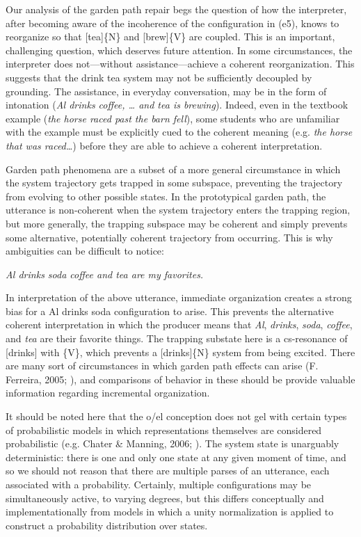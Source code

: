   Our analysis of the garden path repair begs the question of how the interpreter, after becoming aware of the incoherence of the configuration in (e5), knows to reorganize so that [tea]\{N\} and [brew]\{V\} are coupled. This is an important, challenging question, which deserves future attention. In some circumstances, the interpreter does not—without assistance—achieve a coherent reorganization. This suggests that the {\textbar}drink tea{\textbar} system may not be sufficiently decoupled by grounding. The assistance, in everyday conversation, may be in the form of intonation (\textit{Al drinks coffee, … and tea is brewing}). Indeed, even in the textbook example (\textit{the horse raced past the barn fell}), some students who are unfamiliar with the example must be explicitly cued to the coherent meaning (e.g. \textit{the horse that was raced…}) before they are able to achieve a coherent interpretation. 

  Garden path phenomena are a subset of a more general circumstance in which the system trajectory gets trapped in some subspace, preventing the trajectory from evolving to other possible states. In the prototypical garden path, the utterance is non-coherent when the system trajectory enters the trapping region, but more generally, the trapping subspace may be coherent and simply prevents some alternative, potentially coherent trajectory from occurring. This is why ambiguities can be difficult to notice:

    \textit{Al drinks soda coffee and tea are my favorites.}

  In interpretation of the above utterance, immediate organization creates a strong bias for a {\textbar}Al drinks soda{\textbar} configuration to arise. This prevents the alternative coherent interpretation in which the producer means that \textit{Al}, \textit{drinks}, \textit{soda}, \textit{coffee}, and \textit{tea} are their favorite things. The trapping substate here is a cs-resonance of [drinks] with \{V\}, which prevents a [drinks]\{N\} system from being excited. There are many sort of circumstances in which garden path effects can arise (F. Ferreira, 2005; \citealt{Pritchett1988}), and comparisons of behavior in these should be provide valuable information regarding incremental organization. 

  It should be noted here that the o/el conception does not gel with certain types of probabilistic models in which representations themselves are considered probabilistic (e.g. Chater \& Manning, 2006; \citealt{Manning2003}). The system state is unarguably deterministic: there is one and only one state at any given moment of time, and so we should not reason that there are multiple parses of an utterance, each associated with a probability. Certainly, multiple configurations may be simultaneously active, to varying degrees, but this differs conceptually and implementationally from models in which a unity normalization is applied to construct a probability distribution over states.

